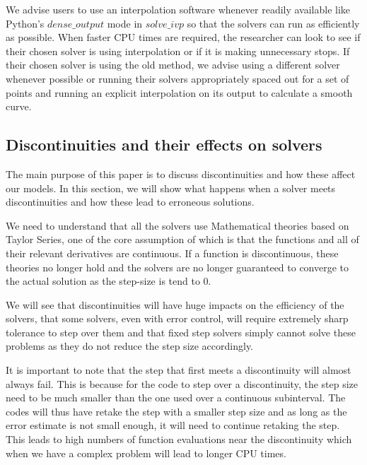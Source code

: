 We advise users to use an interpolation software whenever readily available like Python's $dense\_output$ mode in $solve\_ivp$ so that the solvers can run as efficiently as possible. When faster CPU times are required, the researcher can look to see if their chosen solver is using interpolation or if it is making unnecessary stops. If their chosen solver is using the old method, we advise using a different solver whenever possible or running their solvers appropriately spaced out for a set of points and running an explicit interpolation on its output to calculate a smooth curve.

\subsection{Discontinuities and their effects on solvers}
\label{subsection:effect_of_discontinuity}
The main purpose of this paper is to discuss discontinuities and how these affect our models. In this section, we will show what happens when a solver meets discontinuities and how these lead to erroneous solutions.

We need to understand that all the solvers use Mathematical theories based on Taylor Series, one of the core assumption of which is that the functions and all of their relevant derivatives are continuous. If a function is discontinuous, these theories no longer hold and the solvers are no longer guaranteed to converge to the actual solution as the step-size is tend to 0.

We will see that discontinuities will have huge impacts on the efficiency of the solvers, that some solvers, even with error control, will require extremely sharp tolerance to step over them and that fixed step solvers simply cannot solve these problems as they do not reduce the step size accordingly. 

It is important to note that the step that first meets a discontinuity will almost always fail. This is because for the code to step over a discontinuity, the step size need to be much smaller than the one used over a continuous subinterval. The codes will thus have retake the step with a smaller step size and as long as the error estimate is not small enough, it will need to continue retaking the step. This leads to high numbers of function evaluations near the discontinuity which when we have a complex problem will lead to longer CPU times. 

